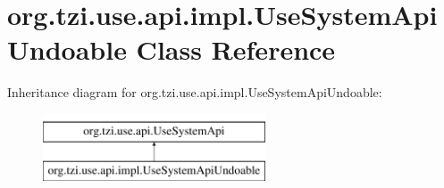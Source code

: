 \hypertarget{classorg_1_1tzi_1_1use_1_1api_1_1impl_1_1_use_system_api_undoable}{\section{org.\-tzi.\-use.\-api.\-impl.\-Use\-System\-Api\-Undoable Class Reference}
\label{classorg_1_1tzi_1_1use_1_1api_1_1impl_1_1_use_system_api_undoable}
}
Inheritance diagram for org.\-tzi.\-use.\-api.\-impl.\-Use\-System\-Api\-Undoable\-:\begin{figure}[H]
\begin{center}
\leavevmode
\includegraphics[height=2.000000cm]{classorg_1_1tzi_1_1use_1_1api_1_1impl_1_1_use_system_api_undoable}
\end{center}
\end{figure}
